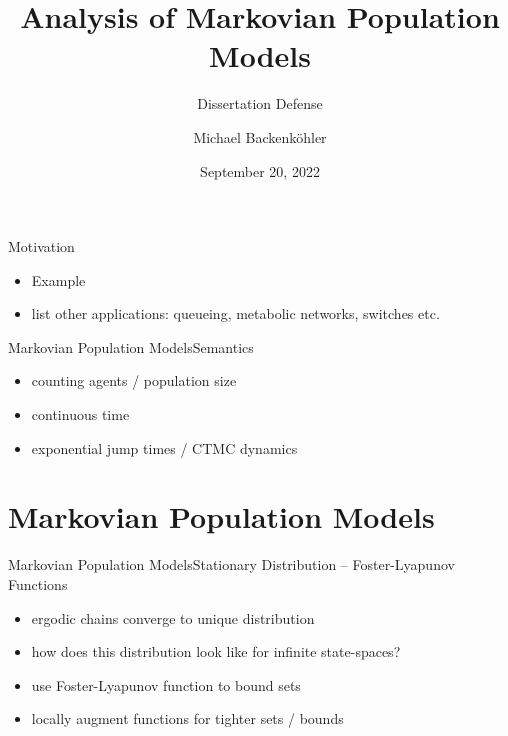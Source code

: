 \documentclass{beamer}
\title{Analysis of Markovian Population Models}
\subtitle{Dissertation Defense}
\author{Michael Backenk\"{o}hler}
\institute{Saarland Informatics Campus}
\date{September 20, 2022}
\begin{document}
\begin{frame}
\titlepage
\end{frame}

\begin{frame}{Motivation}
  \begin{itemize}
    \item Example
    \item list other applications: queueing, metabolic networks, switches etc.
  \end{itemize}
\end{frame}

\begin{frame}{Markovian Population Models}{Semantics}
  \begin{itemize}
    \item counting agents / population size
    \item continuous time
    \item exponential jump times / CTMC dynamics
  \end{itemize}
\end{frame}

\section{Markovian Population Models}
\begin{frame}{Markovian Population Models}{Stationary Distribution -- Foster-Lyapunov Functions}
    \begin{itemize}
        \item ergodic chains converge to unique distribution
        \item how does this distribution look like for infinite state-spaces?
        \item use Foster-Lyapunov function to bound sets
        \item locally augment functions for tighter sets / bounds
    \end{itemize}
\end{frame}
\end{document}
